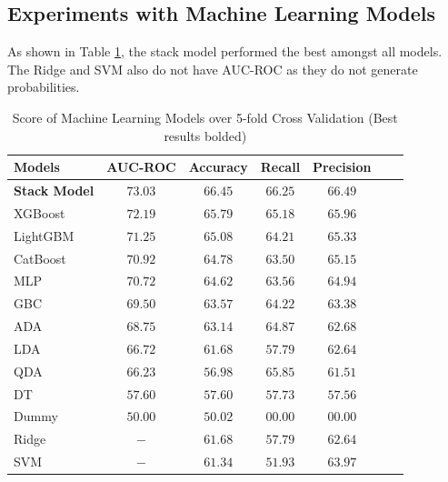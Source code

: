 \documentclass[runningheads]{llncs}
\begin{document}
\subsection{Experiments with Machine Learning Models}
As shown in Table \ref{tab:allaimodels}, the stack model performed the best amongst all models. The Ridge and SVM also do not have AUC-ROC as they do not generate probabilities.
\begin{table}
\centering
\caption{Score of Machine Learning Models over 5-fold Cross Validation (Best results bolded)}
\label{tab:allaimodels}
\begin{tabular}{@{}lcccccc@{}}
\toprule
 {\bf Models} & {\bf AUC-ROC} & {\bf Accuracy} & {\bf Recall} & {\bf Precision} \\ \midrule %
 \textbf{Stack Model} & $\mathbf{73.03}$ & $\mathbf{66.45}$ & $\mathbf{66.25}$ & $\mathbf{66.49}$ \\ 
XGBoost & $72.19$ & $65.79$ & $65.18$ & $65.96$ \\
LightGBM & $71.25$ & $65.08$ & $64.21$ & $65.33$ \\ 
CatBoost & $70.92$ & $64.78$ & $63.50$ & $65.15$ \\ 
MLP & $70.72$ & $64.62 $ & $63.56$ & $64.94$ \\ 
GBC & $69.50$ & $63.57 $ & $64.22$ & $63.38$ \\ 
ADA & $68.75$ & $63.14$ & $64.87$ & $62.68$ \\ 
LDA & $66.72$ & $61.68$ & $57.79$ & $62.64$ \\ 
QDA & $66.23$ & $56.98$ & $65.85$ & $61.51$ \\ 
DT & $57.60$ & $57.60$ & $57.73$ & $57.56$ \\ 
Dummy & $50.00$ & $50.02$ & $00.00$ & $00.00$ \\ 
Ridge & $-$ & $61.68$ & $57.79$ & $62.64$ \\
SVM & $-$ & $61.34$ & $51.93$ & $63.97$ \\ \bottomrule
\end{tabular}%
\vspace{-1ex}
\end{table}
\end{document}
